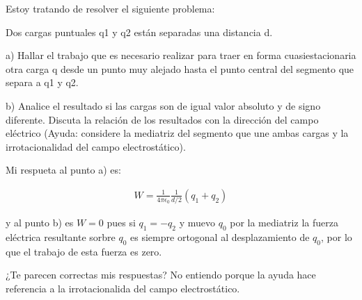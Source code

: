 \documentclass[12pt]{article}
\begin{document}
Estoy tratando de resolver el siguiente problema:

Dos cargas puntuales q1 y q2 están separadas una distancia d.

a) Hallar el trabajo que es necesario realizar para traer en forma
cuasiestacionaria otra carga q desde un punto muy alejado hasta el punto
central del segmento que separa a q1 y q2.

b) Analice el resultado si las cargas son de igual valor absoluto y de signo
diferente.  Discuta la relación de los resultados con la dirección del campo
eléctrico (Ayuda: considere la mediatriz del segmento que une ambas cargas y la
irrotacionalidad del campo electrostático).

Mi respueta al punto a) es:

\begin{align*}
    W=\frac{1}{4\pi\epsilon_0}\frac{1}{d/2}(q_1+q_2)
\end{align*}

\noindent y al punto b) es $W=0$ pues si $q_1=-q_2$ y muevo $q_0$ por la
mediatriz la fuerza eléctrica resultante sorbre $q_0$ es siempre ortogonal al
desplazamiento de $q_0$, por lo que el trabajo de esta fuerza es zero.

¿Te parecen correctas mis respuestas? No entiendo porque la ayuda hace
referencia a la irrotacionalida del campo electrostático.
\end{document}
